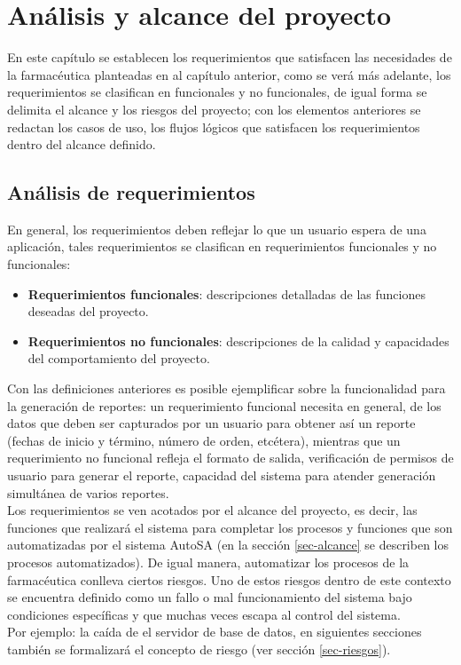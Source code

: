 \chapter{Análisis y alcance del proyecto}\label{cap2}

En este capítulo se establecen los requerimientos que satisfacen las necesidades de la farmacéutica planteadas en al capítulo anterior, como se verá más adelante, los requerimientos se clasifican en funcionales y no funcionales, de igual forma se delimita el alcance y los riesgos del proyecto; con los elementos anteriores se redactan los casos de uso, los flujos lógicos que satisfacen los requerimientos dentro del alcance definido.


\section{Análisis de requerimientos}
En general, los requerimientos deben reflejar lo que un usuario espera de una aplicación, tales requerimientos se clasifican en requerimientos funcionales y no funcionales:
\begin{itemize}
\item \textbf{Requerimientos funcionales}: descripciones detalladas de las funciones deseadas del proyecto\cite{WileyBegSE}.
\item \textbf{Requerimientos no funcionales}: descripciones de la calidad y capacidades del comportamiento del proyecto\cite{WileyBegSE}.
\end{itemize}
Con las definiciones anteriores es posible ejemplificar sobre la funcionalidad para la generación de reportes: un requerimiento funcional necesita en general, de los datos que deben ser capturados por un usuario para obtener así un reporte (fechas de inicio y término, número de orden, etcétera), mientras que un requerimiento no funcional refleja el formato de salida, verificación de permisos de usuario para generar el reporte,  capacidad del sistema para atender generación simultánea de varios reportes.\\
Los requerimientos se ven acotados por el alcance del proyecto, es decir, las funciones que realizará el sistema para completar los procesos y funciones que son automatizadas por el sistema AutoSA\cite{WileyBegSE} (en la sección \ref{sec-alcance} se describen los procesos automatizados). De igual manera, automatizar los procesos de la farmacéutica conlleva ciertos riesgos. Uno de estos riesgos dentro de este contexto se encuentra definido como un fallo o mal funcionamiento del sistema bajo condiciones específicas y que muchas veces escapa al control del sistema.\\
Por ejemplo: la caída de el servidor de base de datos, en siguientes secciones también se formalizará el concepto de riesgo (ver sección \ref{sec-riesgos}).


